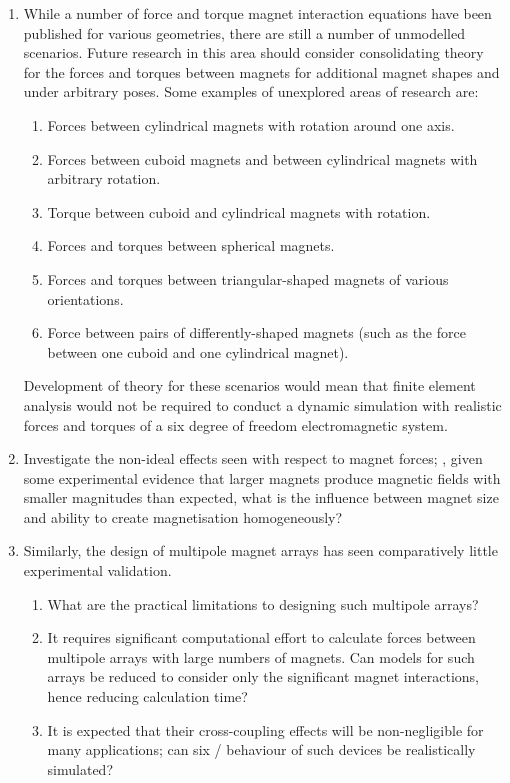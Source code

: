 \documentclass[10pt,a4paper]{memoir}
\begin{document}
\begin{enumerate}\itemsep=\medskipamount
\item
While a number of force and torque magnet interaction equations have been published for various geometries, there are still a number of unmodelled scenarios.
Future research in this area should consider consolidating theory for the forces and torques between magnets for additional magnet shapes and under arbitrary poses.
Some examples of unexplored areas of research are:
\begin{enumerate}
\item Forces between cylindrical magnets with rotation around one axis.
\item Forces between cuboid magnets and between cylindrical magnets with arbitrary rotation.
\item Torque between cuboid and cylindrical magnets with rotation.
\item Forces and torques between spherical magnets.
\item Forces and torques between triangular-shaped magnets of various orientations.
\item Force between pairs of differently-shaped magnets (such as the force between one cuboid and one cylindrical magnet).
\end{enumerate}
Development of theory for these scenarios would mean that finite element analysis would not be required to conduct a dynamic simulation with realistic forces and torques of a six degree of freedom electromagnetic system.

\item
Investigate the non-ideal effects seen with respect to magnet forces; \eg, given some experimental evidence that larger magnets produce magnetic fields with smaller magnitudes than expected, what is the influence between magnet size and ability to create magnetisation homogeneously?

\item
Similarly, the design of multipole magnet arrays has seen comparatively little experimental validation.
\begin{enumerate}
\item
What are the practical limitations to designing such multipole arrays?
\item
It requires significant computational effort to calculate forces between multipole arrays with large numbers of magnets. Can models for such arrays be reduced to consider only the significant magnet interactions, hence reducing calculation time?
\item
It is expected that their cross-coupling effects will be non-negligible for many applications; can six \dof/ behaviour of such devices be realistically simulated?
\end{enumerate}

\end{enumerate}
\end{document}
